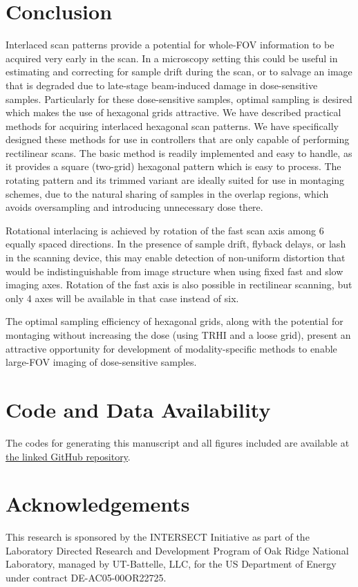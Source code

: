 \documentclass[aip, amsmath, amssymb, nobibnotes, nofootinbib, citeautoscript, reprint, superscriptaddress]{revtex4-1}
\begin{document}
    \section{\label{sec:conclusion}Conclusion}

    Interlaced scan patterns provide a potential for whole-FOV information to be acquired very early in the scan.
    In a microscopy setting this could be useful in estimating and correcting for sample drift during the scan, or to salvage an image that is degraded due to late-stage beam-induced damage in dose-sensitive samples.
    Particularly for these dose-sensitive samples, optimal sampling is desired which makes the use of hexagonal grids attractive.
    We have described practical methods for acquiring interlaced hexagonal scan patterns.
    We have specifically designed these methods for use in controllers that are only
    capable of performing rectilinear scans.
    The basic method is readily implemented and easy to handle, as it provides a square (two-grid) hexagonal pattern which is easy to process.
    The rotating pattern and its trimmed variant are ideally suited for use in montaging schemes, due to the natural sharing of samples in the overlap regions, which avoids oversampling and introducing unnecessary dose there.

    Rotational interlacing is achieved by rotation of the fast scan axis among 6
    equally spaced directions.
    In the presence of sample drift, flyback delays, or lash in the scanning device,
    this may enable detection of non-uniform distortion that would be
    indistinguishable from image structure when using fixed fast and slow imaging
    axes.
    Rotation of the fast axis is also possible in rectilinear scanning, but only 4
    axes will be available in that case instead of six.

    The optimal sampling efficiency of hexagonal grids, along with the potential for
    montaging without increasing the dose (using TRHI and a loose grid), present an
    attractive opportunity for development of modality-specific methods to enable
    large-FOV imaging of dose-sensitive samples.

    \section*{Code and Data Availability}

    The codes for generating this manuscript and all figures included are available at \href{https://github.com/jacobhinkle/hex_interlacing}{the linked GitHub repository}. 

    \section*{\label{sec:acknowledgement}Acknowledgements}

    This research is sponsored by the INTERSECT Initiative as part of the Laboratory Directed Research and Development Program of Oak Ridge National Laboratory, managed by UT-Battelle, LLC, for the US Department of Energy under contract DE-AC05-00OR22725. 

    
\end{document}
